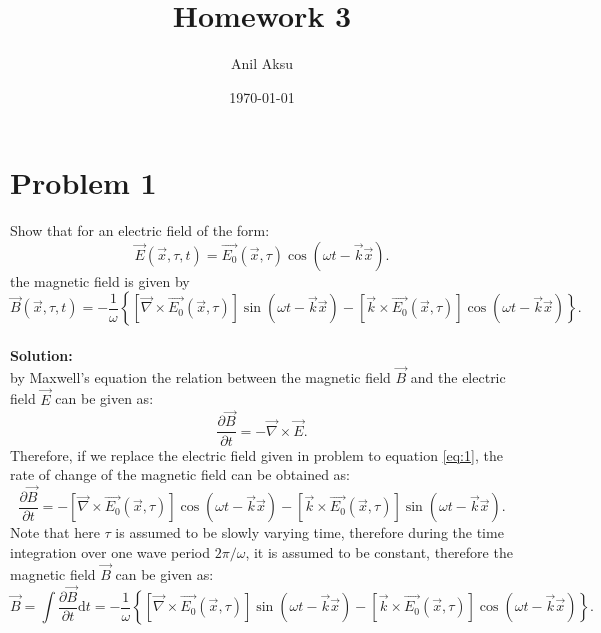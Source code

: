 \documentclass[11pt]{amsart}
\title{Homework 3}
\author{Anil Aksu}
\date{\today}
\begin{document}
\maketitle

\section*{Problem 1 }
Show that for an electric field of the form: 
\begin{equation*}
\vec{E}(\vec{x},\tau,t)=\vec{E_0}(\vec{x},\tau)\cos(\omega t- \vec{k}\vec{x}).
\end{equation*}
the magnetic field is given by
\begin{equation*}
\vec{B}(\vec{x},\tau,t)=-\frac{1}{\omega}\left \{  \left [\vec{\nabla}\times \vec{E_0}(\vec{x},\tau) \right ]\sin(\omega t -\vec{k}\vec{x})-\left [\vec{k}\times  \vec{E_0}(\vec{x},\tau) \right ]\cos(\omega t- \vec{k}\vec{x})\right \}.
\end{equation*}
\\
\textbf{Solution:}\\
by Maxwell's equation the relation between the magnetic field $\vec{B}$ and the electric field $\vec{E}$ can be given as:
\begin{equation}
\label{eq:1}
\frac{\partial \vec{B}}{\partial t}=-\vec{\nabla}\times\vec{E}.
\end{equation}
Therefore, if we replace the electric field given in problem to equation \ref{eq:1}, the rate of change of the magnetic field can be obtained as:
\begin{equation}
\label{eq:2}
\frac{\partial \vec{B}}{\partial t}= -\left [\vec{\nabla}\times \vec{E_0}(\vec{x},\tau) \right ]\cos(\omega t -\vec{k}\vec{x})-\left [\vec{k}\times  \vec{E_0}(\vec{x},\tau) \right ]\sin(\omega t- \vec{k}\vec{x}).
\end{equation}
Note that here $\tau$ is assumed to be slowly varying time, therefore during the time integration over one wave period $2\pi / \omega$, it is assumed to be constant, therefore the magnetic field $\vec{B}$ can be given as:
\begin{equation}
\label{eq:3}
\vec{B}=\int \frac{\partial \vec{B}}{\partial t} \mathrm{d} t=-\frac{1}{\omega}\left \{  \left [\vec{\nabla}\times \vec{E_0}(\vec{x},\tau) \right ]\sin(\omega t -\vec{k}\vec{x})-\left [\vec{k}\times  \vec{E_0}(\vec{x},\tau) \right ]\cos(\omega t- \vec{k}\vec{x})\right \}.
\end{equation}
\newpage
\end{document}
